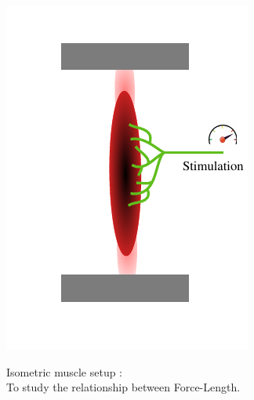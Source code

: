 \documentclass{cmc}
\begin{document}
\begin{figure}[H]
  \centering
  \begin{subfigure}[b]{0.49\textwidth}
    { \centering
      \includegraphics[width=\textwidth]{figures/isometric_muscle} }
    \caption{Isometric muscle setup :\\ To study the relationship
      between Force-Length.}
    \label{fig:isometric_muscle}
  \end{subfigure}
  \begin{subfigure}[b]{0.49\textwidth}
    { \centering
}
\end{subfigure}
\end{figure}
\end{document}
